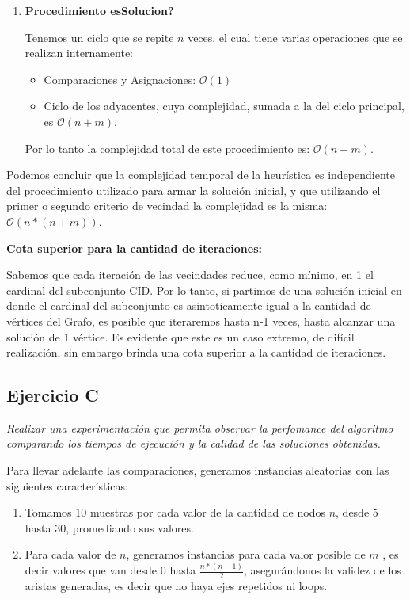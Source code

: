 \begin{enumerate}
  \item \textbf{Procedimiento esSolucion?}

    Tenemos un ciclo que se repite $n$ veces, el cual tiene varias operaciones que se realizan internamente:
  \begin{itemize}
    \item Comparaciones y Asignaciones: $\mathcal{O}(1)$
    \item Ciclo de los adyacentes, cuya complejidad, sumada a la del ciclo principal, es $\mathcal{O}(n + m)$.
  \end{itemize}
  Por lo tanto la complejidad total de este procedimiento es: $\mathcal{O}(n + m)$.

\end{enumerate}

Podemos concluir que la complejidad temporal de la heurística es independiente del procedimiento utilizado para armar la solución inicial, y que utilizando el primer o segundo criterio de vecindad la complejidad es la misma: $\mathcal{O}(n*(n + m))$.\\

\medskip

\textbf{Cota superior para la cantidad de iteraciones:}
\medskip

Sabemos que cada iteración de las vecindades reduce, como mínimo, en 1 el cardinal del subconjunto CID. Por lo tanto, si partimos de una solución inicial en donde el cardinal del subconjunto es asintoticamente igual a la cantidad de vértices del Grafo, es posible que iteraremos hasta n-1 veces, hasta alcanzar una solución de 1 vértice. Es evidente que este es un caso extremo, de difícil realización, sin embargo brinda una cota superior a la cantidad de iteraciones.

\subsection{Ejercicio C}

\textit{Realizar una experimentación que permita observar la perfomance del algoritmo comparando los tiempos de ejecución y la calidad de las soluciones obtenidas.}

\medskip

Para llevar adelante las comparaciones, generamos instancias aleatorias con las siguientes características:
\begin{enumerate}
	\item Tomamos 10 muestras por cada valor de la cantidad de nodos $n$, desde 5 hasta 30, promediando sus valores.
    \item Para cada valor de $n$, generamos instancias para cada valor posible de $m$ , es decir valores que van desde 0 hasta $\frac{n*(n-1)}{2}$, asegurándonos la validez de los aristas generadas, es decir que no haya ejes repetidos ni loops.
\end{enumerate}

